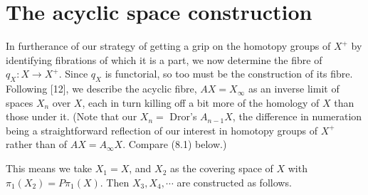\chapter{The acyclic space construction} %
\label{cha:7the_acyclic_space_construction}

In furtherance of our strategy of getting a grip on the homotopy groups of $X^+$ by identifying fibrations of which it is a part, we now determine the fibre of $q_X \colon   X \longrightarrow X^+$. Since $q_X$ is functorial, so too must be the construction of its fibre. Following [12], we describe the acyclic fibre, $AX = X_\infty$ as an inverse limit of spaces $X_n$ over $X$, each in turn killing off a bit more of the homology of $X$ than those under it. (Note that our $X_n =$ Dror's $A_{n-1}X$, the difference in numeration being a straightforward reflection of our interest in homotopy groups of $X^+$ rather than of $AX = A_\infty X$. Compare (8.1) below.)

This means we take $X_1 = X$, and $X_2$ as the covering space of $X$ with $\pi_1 ( X_2) = P\pi_1(X)$. Then $X_3,X_4,\cdots$ are constructed as follows.

